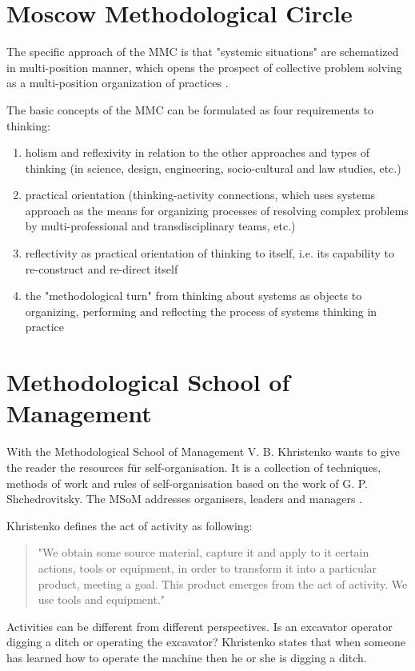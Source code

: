 \documentclass[a4paper,11pt]{article}
\begin{document}
\section{ Moscow Methodological Circle }
The specific approach of the MMC is that "systemic situations" are schematized
in multi-position manner, which opens the prospect of collective problem
solving as a multi-position organization of practices \cite[p. 270]{3}.

The basic concepts of the MMC can be formulated as four requirements to
thinking:
\begin{enumerate}
\item holism and reflexivity in relation to the other approaches and types of
  thinking (in science, design, engineering, socio-cultural and law studies,
  etc.)
\item practical orientation (thinking-activity connections, which uses systems
  approach as the means for organizing processes of resolving complex problems
  by multi-professional and transdisciplinary teams, etc.)
\item reflectivity as practical orientation of thinking to itself, i.e.  its
  capability to re-construct and re-direct itself
\item the "methodological turn" from thinking about systems as objects to
  organizing, performing and reflecting the process of systems thinking in
  practice
\end{enumerate}
 
\section{Methodological School of Management}
With the Methodological School of Management V. B. Khristenko wants to give
the reader the resources für self-organisation. It is a collection of
techniques, methods of work and rules of self-organisation based on the work
of G. P. Shchedrovitsky. The MSoM addresses organisers, leaders and managers
\cite[p. 36]{5}.

Khristenko defines the act of activity as following: 
\begin{quote}
  "We obtain some source material, capture it and apply to it certain actions,
  tools or equipment, in order to transform it into a particular product,
  meeting a goal. This product emerges from the act of activity. We use tools
  and equipment." \cite[p. 36]{5}
\end{quote}
Activities can be different from different perspectives. Is an excavator
operator digging a ditch or operating the excavator? Khristenko states that
when someone has learned how to operate the machine then he or she is digging
a ditch.
\end{document}
